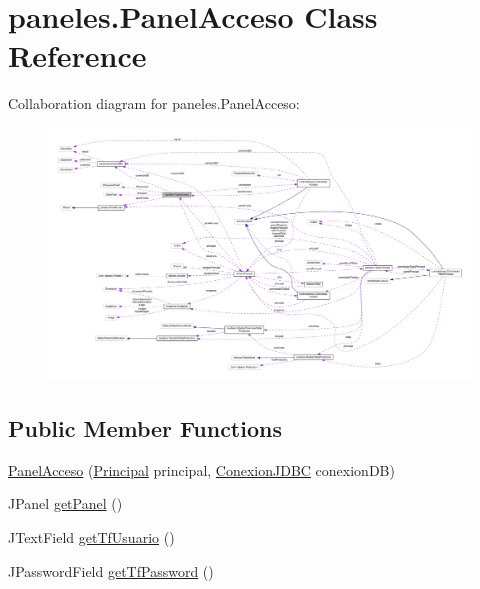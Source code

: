 \hypertarget{classpaneles_1_1_panel_acceso}{}\section{paneles.\+Panel\+Acceso Class Reference}
\label{classpaneles_1_1_panel_acceso}


Collaboration diagram for paneles.\+Panel\+Acceso\+:\nopagebreak
\begin{figure}[H]
\begin{center}
\leavevmode
\includegraphics[width=350pt]{classpaneles_1_1_panel_acceso__coll__graph}
\end{center}
\end{figure}
\subsection*{Public Member Functions}
\begin{DoxyCompactItemize}
\item 
\mbox{\hyperlink{classpaneles_1_1_panel_acceso_ab19590219a09f461529209808b8dbd25}{Panel\+Acceso}} (\mbox{\hyperlink{classvistas_1_1_principal}{Principal}} principal, \mbox{\hyperlink{classmysql_1_1_conexion_j_d_b_c}{Conexion\+J\+D\+BC}} conexion\+DB)
\item 
J\+Panel \mbox{\hyperlink{classpaneles_1_1_panel_acceso_ac978a2c0e1aef22aa66b19abe354b02b}{get\+Panel}} ()
\item 
J\+Text\+Field \mbox{\hyperlink{classpaneles_1_1_panel_acceso_a2e9e57df2c86935dcee9830931a7d3ec}{get\+Tf\+Usuario}} ()
\item 
J\+Password\+Field \mbox{\hyperlink{classpaneles_1_1_panel_acceso_acff0ecd448fa0435276817069e088492}{get\+Tf\+Password}} ()
\end{DoxyCompactItemize}


